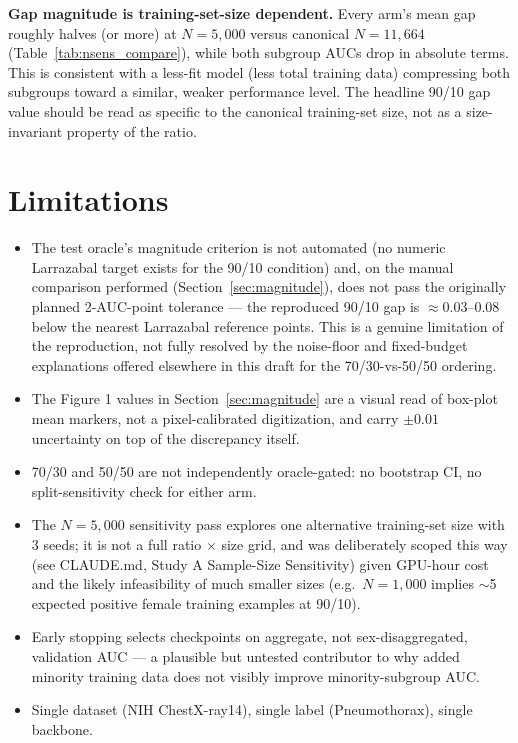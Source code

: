 \documentclass[11pt]{article}
\begin{document}
\textbf{Gap magnitude is training-set-size dependent.} Every arm's mean gap roughly halves (or more) at $N=5{,}000$ versus canonical $N=11{,}664$ (Table~\ref{tab:nsens_compare}), while both subgroup AUCs drop in absolute terms. This is consistent with a less-fit model (less total training data) compressing both subgroups toward a similar, weaker performance level. The headline 90/10 gap value should be read as specific to the canonical training-set size, not as a size-invariant property of the ratio.

\section{Limitations}
\begin{itemize}
\item The test oracle's magnitude criterion is not automated (no numeric Larrazabal target exists for the 90/10 condition) and, on the manual comparison performed (Section~\ref{sec:magnitude}), does not pass the originally planned 2-AUC-point tolerance — the reproduced 90/10 gap is $\approx$0.03--0.08 below the nearest Larrazabal reference points. This is a genuine limitation of the reproduction, not fully resolved by the noise-floor and fixed-budget explanations offered elsewhere in this draft for the 70/30-vs-50/50 ordering.
\item The Figure 1 values in Section~\ref{sec:magnitude} are a visual read of box-plot mean markers, not a pixel-calibrated digitization, and carry $\pm0.01$ uncertainty on top of the discrepancy itself.
\item 70/30 and 50/50 are not independently oracle-gated: no bootstrap CI, no split-sensitivity check for either arm.
\item The $N=5{,}000$ sensitivity pass explores one alternative training-set size with 3 seeds; it is not a full ratio $\times$ size grid, and was deliberately scoped this way (see CLAUDE.md, Study A Sample-Size Sensitivity) given GPU-hour cost and the likely infeasibility of much smaller sizes (e.g.\ $N=1{,}000$ implies $\sim$5 expected positive female training examples at 90/10).
\item Early stopping selects checkpoints on aggregate, not sex-disaggregated, validation AUC — a plausible but untested contributor to why added minority training data does not visibly improve minority-subgroup AUC.
\item Single dataset (NIH ChestX-ray14), single label (Pneumothorax), single backbone.
\end{itemize}
\end{document}
